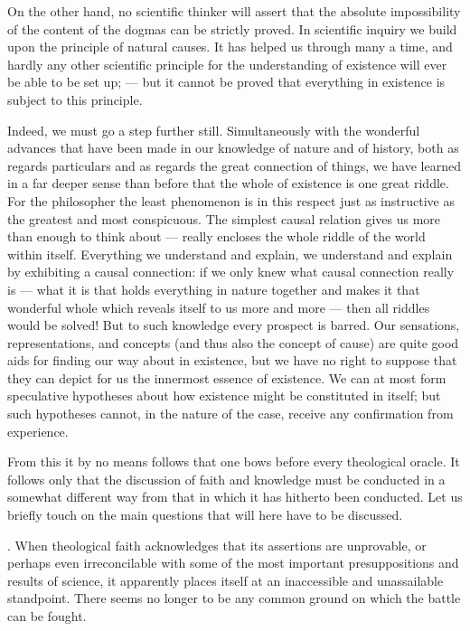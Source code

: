 \documentclass[12pt,a4paper]{article}
\begin{document}
On the other hand, no scientific thinker will assert that the absolute
impossibility of the content of the dogmas can be strictly proved. In
scientific inquiry we build upon the principle of natural causes. It has helped
us through many a time, and hardly any other scientific principle for the
understanding of existence will ever be able to be set up; --- but it cannot be
proved that everything in existence is subject to this principle.

Indeed, we must go a step further still. Simultaneously with the wonderful
advances that have been made in our knowledge of nature and of history, both as
regards particulars and as regards the great connection of things, we have
learned in a far deeper sense than before that the whole of existence is one
great riddle. For the philosopher the least phenomenon is in this respect just
as instructive as the greatest and most conspicuous. The simplest causal
relation gives us more than enough to think about --- really encloses the whole
riddle of the world within itself. Everything we understand and explain, we
understand and explain by exhibiting a causal connection: if we only knew what
causal connection really is --- what it is that holds everything in nature
together and makes it that wonderful whole which reveals itself to us more and
more --- then all riddles would be solved! But to such knowledge every prospect
is barred. Our sensations, representations, and concepts (and thus also the
concept of cause) are quite good aids for finding our way about in existence,
but we have no right to suppose that they can depict for us the innermost
essence of existence. We can at most form speculative hypotheses about how
existence might be constituted in itself; but such hypotheses cannot, in the
nature of the case, receive any confirmation from experience.

From this it by no means follows that one bows before every theological oracle.
It follows only that the discussion of faith and knowledge must be conducted in
a somewhat different way from that in which it has hitherto been conducted. Let
us briefly touch on the main questions that will here have to be discussed.

\medskip
{}. When theological faith acknowledges that its assertions are
unprovable, or perhaps even irreconcilable with some of the most important
presuppositions and results of science, it apparently places itself at an
inaccessible and unassailable standpoint. There seems no longer to be any
common ground on which the battle can be fought.
\end{document}
